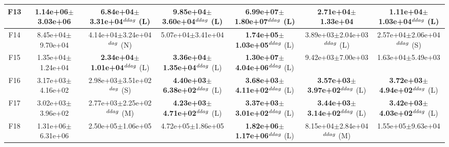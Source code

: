 \begin{table}[!t]
\begin{tabular}{c|cccccc}
F13  & 1.14e+06$\pm$3.03e+06  & 6.84e+04$\pm$3.31e+04$^{\\ddag}$ (L)  & 9.85e+04$\pm$3.60e+04$^{\\ddag}$ (L)  & \textbf{6.99e+07$\pm$1.80e+07}$^{\\ddag}$ (L)  & 2.71e+04$\pm$1.33e+04   & 1.11e+04$\pm$1.03e+04$^{\\ddag}$ (L) \\ \hline
F14  & 8.45e+04$\pm$9.70e+04  & 4.14e+04$\pm$3.24e+04$^{\\dag}$ (N)  & 5.07e+04$\pm$3.41e+04   & \textbf{1.74e+05$\pm$1.03e+05}$^{\\ddag}$ (L)  & 3.89e+03$\pm$2.04e+03$^{\\ddag}$ (L)  & 2.57e+04$\pm$2.06e+04$^{\\ddag}$ (S) \\ \hline
F15  & 1.35e+04$\pm$1.24e+04  & \textbf{2.34e+04$\pm$1.01e+04}$^{\\ddag}$ (L)  & \textbf{3.36e+04$\pm$1.35e+04}$^{\\ddag}$ (L)  & \textbf{1.30e+07$\pm$4.04e+06}$^{\\ddag}$ (L)  & 9.42e+03$\pm$7.00e+03   & 1.63e+04$\pm$5.49e+03  \\ \hline
F16  & 3.17e+03$\pm$4.16e+02  & 2.98e+03$\pm$3.51e+02$^{\\dag}$ (S)  & \textbf{4.40e+03$\pm$6.38e+02}$^{\\ddag}$ (L)  & \textbf{3.68e+03$\pm$4.11e+02}$^{\\ddag}$ (L)  & \textbf{3.57e+03$\pm$3.97e+02}$^{\\ddag}$ (L)  & \textbf{3.72e+03$\pm$4.94e+02}$^{\\ddag}$ (L) \\ \hline
F17  & 3.02e+03$\pm$3.96e+02  & 2.77e+03$\pm$2.25e+02$^{\\ddag}$ (M)  & \textbf{4.23e+03$\pm$4.71e+02}$^{\\ddag}$ (L)  & \textbf{3.37e+03$\pm$3.01e+02}$^{\\ddag}$ (L)  & \textbf{3.44e+03$\pm$3.14e+02}$^{\\ddag}$ (L)  & \textbf{3.42e+03$\pm$4.03e+02}$^{\\ddag}$ (L) \\ \hline
F18  & 1.31e+06$\pm$6.31e+06  & 2.50e+05$\pm$1.06e+05   & 4.72e+05$\pm$1.86e+05   & \textbf{1.82e+06$\pm$1.17e+06}$^{\\ddag}$ (L)  & 8.15e+04$\pm$2.84e+04$^{\\ddag}$ (M)  & 1.55e+05$\pm$9.63e+04  \\ \hline

\end{tabular}
\end{table}
